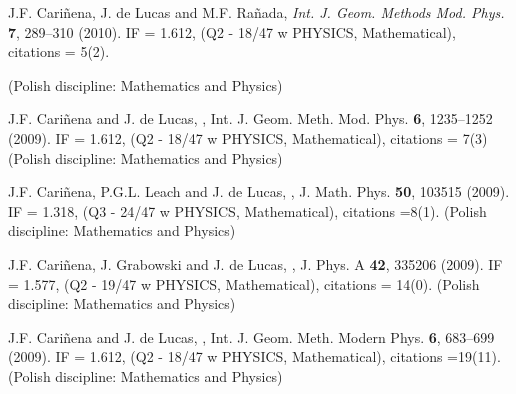 \documentclass[12pt,reqno]{amsbook}
\begin{document}
\begin{enumerate}
%

{
\item J.F. Cari\~nena, J. de Lucas and M.F. Ra\~nada,
\color{blue}{ Lie systems and integrability conditions for $t$-dependent frequency harmonics oscillators,} \color{black} {\it Int. J. Geom. Methods Mod. Phys.} {\bf 7}, 289--310 (2010). IF = 1.612, (Q2 - 18/47 w PHYSICS, Mathematical), citations = 5(2).} (Polish discipline: Mathematics and Physics)

\item J.F. Cari\~nena and J. de Lucas,
\color{black}, Int. J. Geom. Meth. Mod. Phys. {\bf 6}, 1235--1252 (2009). IF = 1.612, (Q2 - 18/47 w PHYSICS, Mathematical), citations = 7(3) (Polish discipline: Mathematics and Physics)

\item J.F. Cari\~nena, P.G.L. Leach and J. de Lucas,
\color{blue}{\it Quasi-Lie schemes and Emden--Fowler equations} \color{black}, J. Math. Phys. {\bf 50}, 103515 (2009). IF = 1.318, (Q3 - 24/47 w PHYSICS, Mathematical), citations =8(1).  (Polish discipline: Mathematics and Physics)

\item J.F. Cari\~nena, J. Grabowski and J. de Lucas,
\color{blue}{\it Quasi-Lie schemes: theory and applications}\color{black}, J. Phys. A {\bf 42}, 335206 (2009). IF = 1.577, (Q2 - 19/47 w PHYSICS, Mathematical), citations = 14(0).  (Polish discipline: Mathematics and Physics)

\item  J.F. Cari\~nena and J. de Lucas,
\color{blue}{\it Applications of Lie systems in dissipative Milne--Pinney equations}\color{black}, Int. J. Geom. Meth. Modern Phys. {\bf 6}, 683--699 (2009).  IF = 1.612, (Q2 - 18/47 w PHYSICS, Mathematical), citations =19(11). (Polish discipline: Mathematics and Physics)


\end{enumerate}
\end{document}
